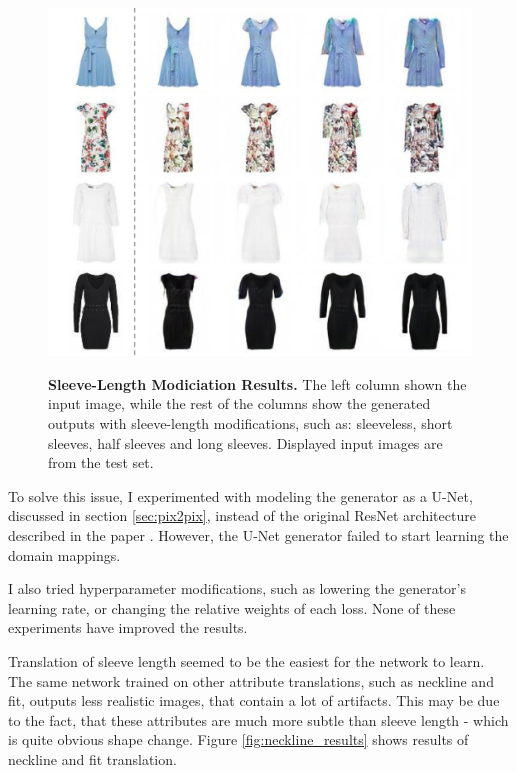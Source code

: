 \documentclass[12pt]{report}
\begin{document}
\begin{figure}[h]
\centering
{\includegraphics[width=.7\linewidth]{04_experiments/stargan/sleeve_results}}
\caption{\label{fig:sleeves_results} \textbf{Sleeve-Length Modiciation Results.} The left column shown the input image, while the rest of the columns show the generated outputs with sleeve-length modifications, such as: sleeveless, short sleeves, half sleeves and long sleeves. Displayed input images are from the test set.}
\end{figure}

To solve this issue, I experimented with modeling the generator as a U-Net, discussed in section \ref{sec:pix2pix}, instead of the original ResNet architecture described in the paper \cite{choi_stargan_2017}. However, the U-Net generator failed to start learning the domain mappings.

I also tried hyperparameter modifications, such as lowering the generator's learning rate, or changing the relative weights of each loss. None of these experiments have improved the results.

\pagebreak
Translation of sleeve length seemed to be the easiest for the network to learn. The same network trained on other attribute translations, such as neckline and fit, outputs less realistic images, that contain a lot of artifacts. This may be due to the fact, that these attributes are much more subtle than sleeve length - which is quite obvious shape change. Figure \ref{fig:neckline_results} shows results of neckline and fit translation.
\end{document}
